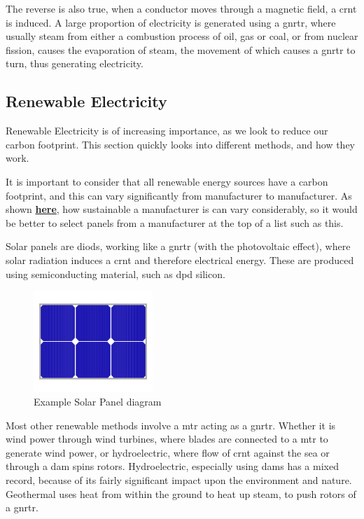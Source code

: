 \documentclass[a4paper,11pt]{report}
\let\oldhref\href %
\renewcommand{\href}[2]{\oldhref{#1}{\bfseries#2}}
\begin{document}
The reverse is also true, when a conductor moves through a magnetic field, a \gls{crnt} is induced. A large proportion of electricity is generated using a \gls{gnrtr}, where usually steam from either a combustion process of oil, gas or coal, or from nuclear fission, causes the evaporation of steam, the movement of which causes a \gls{gnrtr} to turn, thus generating electricity.

\vspace*{1\baselineskip}

\subsection{Renewable Electricity}

Renewable Electricity is of increasing importance, as we look to reduce our carbon footprint. This section quickly looks into different methods, and how they work.

It is important to consider that all renewable energy sources have a carbon footprint, and this can vary significantly from manufacturer to manufacturer. As shown \href{http://www.solars\gls{core}card.com/2018-19/2018-19-SVTC-Solar-S\gls{core}card.pdf}{here}, how sustainable a manufacturer is can vary considerably, so it would be better to select panels from a manufacturer at the top of a list such as this.

Solar panels are \gls{diod}s, working like a \gls{gnrtr} (with the photovoltaic effect), where solar radiation induces a \gls{crnt} and therefore electrical energy. These are produced using semiconducting material, such as \gls{dpd} silicon.

\begin{figure}[H]
\centering
\includegraphics[width=0.4\textwidth]{solarpanel}
\caption{Example Solar Panel diagram}
\end{figure}

Most other renewable methods involve a \gls{mtr} acting as a \gls{gnrtr}. Whether it is wind power through wind turbines, where blades are connected to a \gls{mtr} to generate wind power, or hydroelectric, where flow of \gls{crnt} against the sea or through a dam spins rotors. Hydroelectric, especially using dams has a mixed record, because of its fairly significant impact upon the environment and nature. Geothermal uses heat from within the ground to heat up steam, to push rotors of a \gls{gnrtr}.
\end{document}
